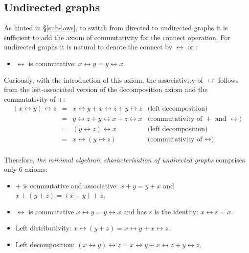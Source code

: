 \subsection{Undirected graphs}\label{sub-undirected}

As hinted in \S\ref{sub-laws}, to switch from directed to undirected graphs it
is sufficient to add the axiom of commutativity for the connect operation. For
undirected graphs it is natural to denote the connect by $\leftrightarrow$ or
\textemdash:

\begin{itemize}
    \item $\leftrightarrow$ is commutative: $x \leftrightarrow y = y \leftrightarrow x$.
\end{itemize}

Curiously, with the introduction of this axiom, the associativity of $\leftrightarrow$
follows from the left-associated version of the decomposition axiom and the
commutativity of $+$:
\[
\begin{array}{rcll}
(x \leftrightarrow y) \leftrightarrow z & = & x \leftrightarrow y + x \leftrightarrow z + y \leftrightarrow z & \text{(left decomposition)}\\
 & = & y \leftrightarrow z + y \leftrightarrow x + z \leftrightarrow x & \text{(commutativity of $+$ and $\leftrightarrow$)}\\
 & = &  (y \leftrightarrow z) \leftrightarrow x & \text{(left decomposition)}\\
 & = &   x \leftrightarrow (y \leftrightarrow z) & \text{(commutativity of $\leftrightarrow$)}\\
\end{array}
\]

Therefore, \emph{the minimal algebraic characterisation of undirected graphs}
comprises only 6 axioms:

\begin{itemize}
    \item $+$ is commutative and associative: $x + y = y + x$ and
    $x + (y + z) = (x + y) + z$.
    \item $\leftrightarrow$ is commutative $x \leftrightarrow y = y \leftrightarrow x$ and
    has $\varepsilon$ is the identity: $x \leftrightarrow \varepsilon = x$.
    \item Left distributivity:
    $x \leftrightarrow (y + z) = x \leftrightarrow y + x \leftrightarrow z$.
    \item Left decomposition: $(x \leftrightarrow y) \leftrightarrow z =
    x \leftrightarrow y + x \leftrightarrow z + y \leftrightarrow z$.
\end{itemize}

